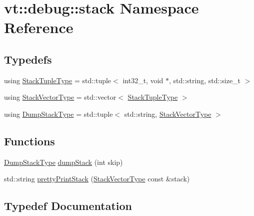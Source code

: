 \hypertarget{namespacevt_1_1debug_1_1stack}{}\section{vt\+:\+:debug\+:\+:stack Namespace Reference}
\label{namespacevt_1_1debug_1_1stack}
\subsection*{Typedefs}
\begin{DoxyCompactItemize}
\item 
using \hyperlink{namespacevt_1_1debug_1_1stack_af6f37721aa17b48f85795cdaab356ced}{Stack\+Tuple\+Type} = std\+::tuple$<$ int32\+\_\+t, void $\ast$, std\+::string, std\+::size\+\_\+t $>$
\item 
using \hyperlink{namespacevt_1_1debug_1_1stack_a29a3bbd4c51f20720ef437f124de9b62}{Stack\+Vector\+Type} = std\+::vector$<$ \hyperlink{namespacevt_1_1debug_1_1stack_af6f37721aa17b48f85795cdaab356ced}{Stack\+Tuple\+Type} $>$
\item 
using \hyperlink{namespacevt_1_1debug_1_1stack_af0021ab2e0ec90b6c299c2e7a62d0257}{Dump\+Stack\+Type} = std\+::tuple$<$ std\+::string, \hyperlink{namespacevt_1_1debug_1_1stack_a29a3bbd4c51f20720ef437f124de9b62}{Stack\+Vector\+Type} $>$
\end{DoxyCompactItemize}
\subsection*{Functions}
\begin{DoxyCompactItemize}
\item 
\hyperlink{namespacevt_1_1debug_1_1stack_af0021ab2e0ec90b6c299c2e7a62d0257}{Dump\+Stack\+Type} \hyperlink{namespacevt_1_1debug_1_1stack_a89827f4a5411b18eb8fd0ea41d7b869d}{dump\+Stack} (int skip)
\item 
std\+::string \hyperlink{namespacevt_1_1debug_1_1stack_a6c32eaeca4f5c8da5af1451d77031b3e}{pretty\+Print\+Stack} (\hyperlink{namespacevt_1_1debug_1_1stack_a29a3bbd4c51f20720ef437f124de9b62}{Stack\+Vector\+Type} const \&stack)
\end{DoxyCompactItemize}


\subsection{Typedef Documentation}
\mbox{\label{namespacevt_1_1debug_1_1stack_af0021ab2e0ec90b6c299c2e7a62d0257}} 
